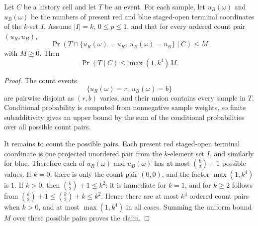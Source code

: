 \begin{helper}
Let \(C\) be a history cell and let \(T\) be an event.  For each sample, let
\(u_R(\omega)\) and \(u_B(\omega)\) be the numbers of present red and blue
staged-open terminal coordinates of the \(k\)-set \(I\).  Assume
\(|I|=k\), \(0\le p\le1\), and that for every ordered count pair
\((u_R,u_B)\),
\[
\Pr(T\cap\{u_R(\omega)=u_R,\ u_B(\omega)=u_B\}\mid C)\le M
\]
with \(M\ge0\).  Then
\[
\Pr(T\mid C)\le \max(1,k^4)M.
\]
\end{helper}
\begin{proof}
The count events
\[
\{u_R(\omega)=r,\ u_B(\omega)=b\}
\]
are pairwise disjoint as \((r,b)\) varies, and their union contains every
sample in \(T\).  Conditional probability is computed from nonnegative sample
weights, so finite subadditivity gives an upper bound by the sum of the
conditional probabilities over all possible count pairs.

It remains to count the possible pairs.  Each present red staged-open
terminal coordinate is one projected unordered pair from the \(k\)-element set
\(I\), and similarly for blue.  Therefore each of \(u_R(\omega)\) and
\(u_B(\omega)\) has at most \(\binom{k}{2}+1\) possible values.  If \(k=0\),
there is only the count pair \((0,0)\), and the factor \(\max(1,k^4)\) is
\(1\).  If \(k>0\), then \(\binom{k}{2}+1\le k^2\): it is immediate for
\(k=1\), and for \(k\ge2\) follows from
\(\binom{k}{2}+1\le \binom{k}{2}+k\le k^2\).  Hence there are at most
\(k^4\) ordered count pairs when \(k>0\), and at most \(\max(1,k^4)\) in all
cases.  Summing the uniform bound \(M\) over these possible pairs proves the
claim.
\end{proof}
